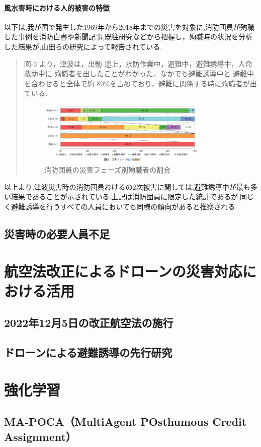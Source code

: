 \paragraph{風水害時における人的被害の特徴}
以下は,我が国で発生した1969年から2018年までの災害を対象に,消防団員が殉職した事例を消防白書や新聞記事,既往研究などから把握し，殉職時の状況を分析した結果が,山田らの研究\cite{yamada2020}によって報告されている.
\begin{quote}
  図-3 より，津波は，出動 途上，水防作業中，避難中，避難誘導中，人命救助中に 殉職者を出したことがわかった．なかでも避難誘導中と 避難中を合わせると全体で約 80\%を占めており，避難に関係する時に殉職者が出ている．
  \begin{figure}[H] 
    \centering 
    \includegraphics[width=0.8\textwidth]{Figures/fig-01.png}
    \caption{消防団員の災害フェーズ別殉職者の割合} 
    \label{fig:01} 
\end{figure}
\end{quote}
以上より,津波災害時の消防団員おけるの2次被害に関しては,避難誘導中が最も多い結果であることが示されている.上記は消防団員に限定した統計であるが,同じく避難誘導を行うすべての人員においても同様の傾向があると推察される.

  \subsection{災害時の必要人員不足}
\section{航空法改正によるドローンの災害対応における活用}
  \subsection{2022年12月5日の改正航空法の施行}
  \subsection{ドローンによる避難誘導の先行研究}
\section{強化学習}
  \subsection{MA-POCA（MultiAgent POsthumous Credit Assignment）}

